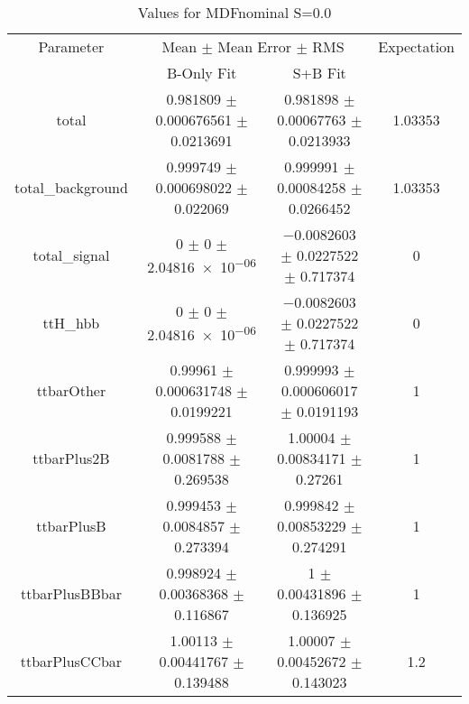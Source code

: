 \begin{table}
\centering
\caption{Values for MDFnominal S=0.0}
\begin{tabular}{cccc}
\toprule
Parameter & \multicolumn{2}{c}{Mean $\pm$ Mean Error $\pm$ RMS} & Expectation\\
 & B-Only Fit & S+B Fit & \\
\midrule
total & \num{0.981809} $\pm$ \num{0.000676561} $\pm$ \num{0.0213691} & \num{0.981898} $\pm$ \num{0.00067763} $\pm$ \num{0.0213933} & \num{1.03353}\\
total\_background & \num{0.999749} $\pm$ \num{0.000698022} $\pm$ \num{0.022069} & \num{0.999991} $\pm$ \num{0.00084258} $\pm$ \num{0.0266452} & \num{1.03353}\\
total\_signal & \num{0} $\pm$ \num{0} $\pm$ \num{2.04816e-06} & \num{-0.0082603} $\pm$ \num{0.0227522} $\pm$ \num{0.717374} & \num{0}\\
ttH\_hbb & \num{0} $\pm$ \num{0} $\pm$ \num{2.04816e-06} & \num{-0.0082603} $\pm$ \num{0.0227522} $\pm$ \num{0.717374} & \num{0}\\
ttbarOther & \num{0.99961} $\pm$ \num{0.000631748} $\pm$ \num{0.0199221} & \num{0.999993} $\pm$ \num{0.000606017} $\pm$ \num{0.0191193} & \num{1}\\
ttbarPlus2B & \num{0.999588} $\pm$ \num{0.0081788} $\pm$ \num{0.269538} & \num{1.00004} $\pm$ \num{0.00834171} $\pm$ \num{0.27261} & \num{1}\\
ttbarPlusB & \num{0.999453} $\pm$ \num{0.0084857} $\pm$ \num{0.273394} & \num{0.999842} $\pm$ \num{0.00853229} $\pm$ \num{0.274291} & \num{1}\\
ttbarPlusBBbar & \num{0.998924} $\pm$ \num{0.00368368} $\pm$ \num{0.116867} & \num{1} $\pm$ \num{0.00431896} $\pm$ \num{0.136925} & \num{1}\\
ttbarPlusCCbar & \num{1.00113} $\pm$ \num{0.00441767} $\pm$ \num{0.139488} & \num{1.00007} $\pm$ \num{0.00452672} $\pm$ \num{0.143023} & \num{1.2}\\
\bottomrule
\end{tabular}
\end{table}